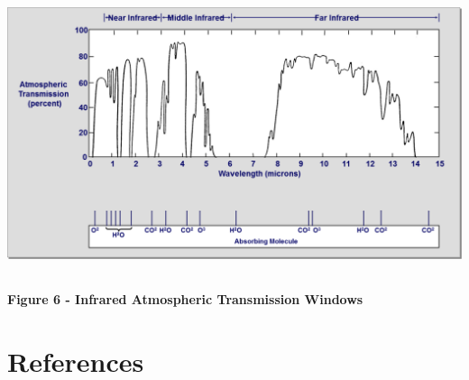 \documentclass[
]{book}
\begin{document}
\includegraphics[width=5.86458in,height=3.2563in]{media/19/image7.png}

\textbf{Figure 6 - Infrared Atmospheric Transmission Windows}

\hypertarget{references}{%
\section{References}\label{references}}
\end{document}
